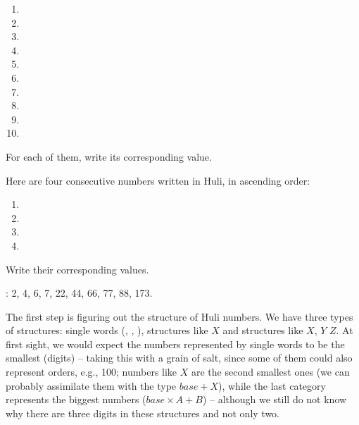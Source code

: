 \begin{refsection}
\begin{problem}{\langnameHuli}{\nameBHuang}{}
\begin{enumerate}[label = \Alph*., leftmargin = 1in]
    \item {}
    \item {}
    \item {}
    \item {}
    \item {}
    \item {}
    \item {}
    \item {}
    \item {}
    \item {}
\end{enumerate}

\begin{assgts}
\item For each of them, write its corresponding value. 
\item Here are four consecutive numbers written in Huli, in ascending order:
\begin{enumerate}[label = \alph*.]
    \item {}
    \item {}
    \item {}
    \item {}
\end{enumerate}
\item[] Write their corresponding values.
\item \taskWriteIn{\langnameHuli}: 2, 4, 6, 7, 22, 44, 66, 77, 88, 173.
\end{assgts}
\end{problem}

\begin{mysolution}

 The first step is figuring out the structure of Huli numbers. We have three types of structures: single words (, , ), structures like  $X$ and structures like  $X$,  $Y$ $Z$. At first sight, we would expect the numbers represented by single words to be the smallest (digits) – taking this with a grain of salt, since some of them could also represent orders, e.g., 100; numbers like  $X$ are the second smallest ones (we can probably assimilate them with the type $base + X$), while the last category represents the biggest numbers ($base \times A + B$) – although we still do not know why there are three digits in these structures and not only two.


\end{mysolution}
\end{refsection}
